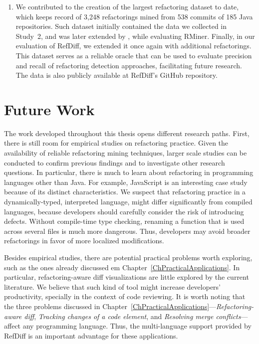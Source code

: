 \begin{enumerate}
\item We contributed to the creation of the largest refactoring dataset to date, which keeps record of 3,248 refactorings mined from 538 commits of 185 Java repositories.
Such dataset initially contained the data we collected in Study~2, and was later extended by \cite{tsantalis2018rminer}, while evaluating RMiner. Finally, in our evaluation of RefDiff, we extended it once again with additional refactorings.
This dataset serves as a reliable oracle that can be used to evaluate precision and recall of refactoring detection approaches, facilitating future research.
The data is also publicly available at RefDiff's GitHub repository.


\end{enumerate}


\section{Future Work}
\label{SecFutureWork}

The work developed throughout this thesis opens different research paths.
First, there is still room for empirical studies on refactoring practice. 
Given the availability of reliable refactoring mining techniques, larger scale studies can be conducted to confirm previous findings and to investigate other research questions.
In particular, there is much to learn about refactoring in programming languages other than Java.
For example, JavaScript is an interesting case study because of its distinct characteristics.
We suspect that refactoring practice in a dynamically-typed, interpreted language, might differ significantly from compiled languages, because developers should carefully consider the risk of introducing defects.
Without compile-time type checking, renaming a function that is used across several files is much more dangerous.
Thus, developers may avoid broader refactorings in favor of more localized modifications.
 
Besides empirical studies, there are potential practical problems worth exploring, such as the ones already discussed em Chapter~\ref{ChPracticalApplications}.
In particular, refactoring-aware diff visualizations are little explored by the current literature.
We believe that such kind of tool might increase developers' productivity, specially in the context of code reviewing.
It is worth noting that the three problems discussed in Chapter~\ref{ChPracticalApplications}---\emph{Refactoring-aware diff}, \emph{Tracking changes of a code element}, and \emph{Resolving merge conflicts}---affect any programming language. Thus, the multi-language support provided by RefDiff is an important advantage for these applications.

